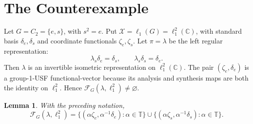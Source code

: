 \documentclass[11pt]{article}
\newtheorem{lemma}{Lemma}
\newcommand{\C}{\mathbb C}
\newcommand{\T}{\mathbb T}
\newcommand{\FG}{\mathscr F_G}
\newcommand{\de}{\delta_e}
\newcommand{\ds}{\delta_s}
\newcommand{\ze}{\zeta_e}
\newcommand{\zs}{\zeta_s}
\begin{document}
\section*{The Counterexample}

Let \(G=C_2=\{e,s\}\), with \(s^2=e\). Put
\(\mathcal X=\ell_1(G)=\ell_1^2(\C)\), with standard basis
\(\de,\ds\) and coordinate functionals \(\ze,\zs\). Let \(\pi=\lambda\) be the
left regular representation:
\[
  \lambda_s\de=\ds,\qquad \lambda_s\ds=\de.
\]
Then \(\lambda\) is an invertible isometric representation on \(\ell_1^2(\C)\).
The pair \((\ze,\de)\) is a group-1-USF functional-vector because its analysis
and synthesis maps are both the identity on \(\ell_1^2\). Hence
\(\FG(\lambda,\ell_1^2)\neq\varnothing\).

\begin{lemma}
With the preceding notation,
\[
\FG(\lambda,\ell_1^2)
=
\{(\alpha\ze,\alpha^{-1}\de):\alpha\in\T\}
\cup
\{(\alpha\zs,\alpha^{-1}\ds):\alpha\in\T\}.
\]
\end{lemma}
\end{document}
